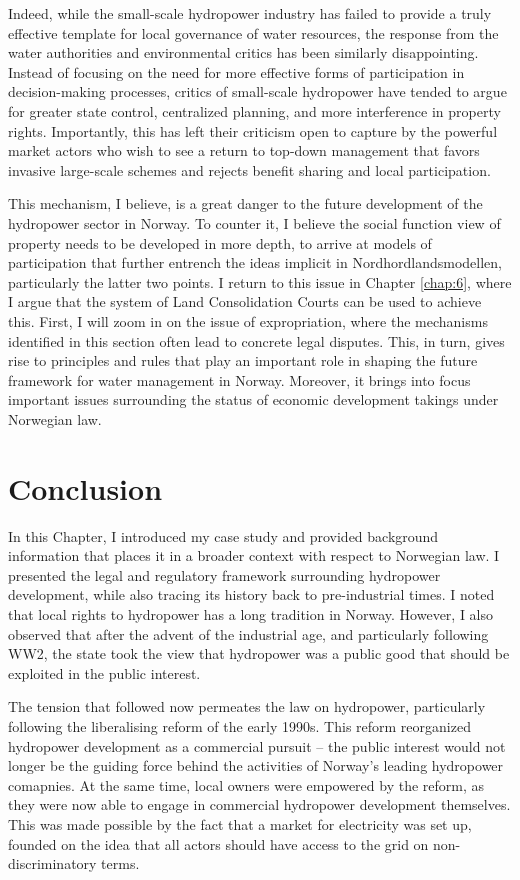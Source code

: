 Indeed, while the small-scale hydropower industry has failed to provide a truly effective template for local governance of water resources, the response from the water authorities and environmental critics has been similarly disappointing. Instead of focusing on the need for more effective forms of participation in decision-making processes, critics of small-scale hydropower have tended to argue for greater state control, centralized planning, and more interference in property rights. Importantly, this has left their criticism open to capture by the powerful market actors who wish to see a return to top-down management that favors invasive large-scale schemes and rejects benefit sharing and local participation.

This mechanism, I believe, is a great danger to the future development of the hydropower sector in Norway. To counter it, I believe the social function view of property needs to be developed in more depth, to arrive at models of participation that further entrench the ideas implicit in Nordhordlandsmodellen, particularly the latter two points. I return to this issue in Chapter \ref{chap:6}, where I argue that the system of Land Consolidation Courts can be used to achieve this. First, I will zoom in on the issue of expropriation, where the mechanisms identified in this section often lead to concrete legal disputes. This, in turn, gives rise to principles and rules that play an important role in shaping the future framework for water management in Norway. Moreover, it brings into focus important issues surrounding the status of economic development takings under Norwegian law.

\section{Conclusion}\label{sec:conc3}

In this Chapter, I introduced my case study and provided background information that places it in a broader context with respect to Norwegian law. I presented the legal and regulatory framework surrounding hydropower development, while also tracing its history back to pre-industrial times. I noted that local rights to hydropower has a long tradition in Norway. However, I also observed that after the advent of the industrial age, and particularly following WW2, the state took the view that hydropower was a public good that should be exploited in the public interest. 

The tension that followed now permeates the law on hydropower, particularly following the liberalising reform of the early 1990s. This reform reorganized hydropower development as a commercial pursuit -- the public interest would not longer be the guiding force behind the activities of Norway's leading hydropower comapnies. At the same time, local owners were empowered by the reform, as they were now able to engage in commercial hydropower development themselves. This was made possible by the fact that a market for electricity was set up, founded on the idea that all actors should have access to the grid on non-discriminatory terms. 

